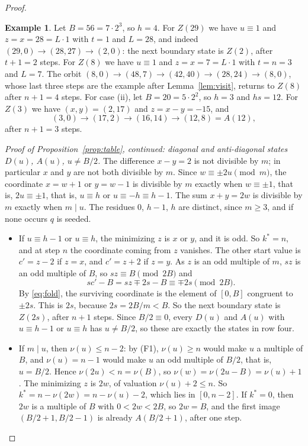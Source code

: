 \documentclass[11pt]{amsart}
\theoremstyle{definition}
\newtheorem*{example}{Example}
\theoremstyle{remark}
\newcommand{\vt}{\nu}
\begin{document}
\begin{proof}
\begin{example}
Let $B=56=7\cdot2^3$, so $h=4$. For $Z(29)$ we have $u\equiv1$ and $z=x=28=L\cdot1$ with $t=1$ and $L=28$, and indeed $(29,0)\to(28,27)\to(2,0)$: the next boundary state is $Z(2)$, after $t+1=2$ steps. For $Z(8)$ we have $u\equiv1$ and $z=x=7=L\cdot1$ with $t=n=3$ and $L=7$. The orbit $(8,0)\to(48,7)\to(42,40)\to(28,24)\to(8,0)$, whose last three steps are the example after Lemma~\ref{lem:visit}, returns to $Z(8)$ after $n+1=4$ steps. For case (ii), let $B=20=5\cdot2^2$, so $h=3$ and $hs=12$. For $Z(3)$ we have $(x,y)=(2,17)$ and $z=x-y=-15$, and
\[
(3,0)\to(17,2)\to(16,14)\to(12,8)=A(12),
\]
after $n+1=3$ steps.
\end{example}

\emph{Proof of Proposition~\ref{prop:table}, continued: diagonal and anti-diagonal states $D(u)$, $A(u)$, $u\ne B/2$.} The difference $x-y=2$ is not divisible by $m$; in particular $x$ and $y$ are not both divisible by $m$. Since $w\equiv\pm2u\pmod m$, the coordinate $x=w+1$ or $y=w-1$ is divisible by $m$ exactly when $w\equiv\pm1$, that is, $2u\equiv\pm1$, that is, $u\equiv h$ or $u\equiv-h\equiv h-1$. The sum $x+y=2w$ is divisible by $m$ exactly when $m\mid u$. The residues $0$, $h-1$, $h$ are distinct, since $m\ge3$, and if none occurs $q$ is seeded.
\begin{itemize}
\item[(i)] If $u\equiv h-1$ or $u\equiv h$, the minimizing $z$ is $x$ or $y$, and it is odd. So $k^*=n$, and at step $n$ the coordinate coming from $z$ vanishes. The other start value is $c'=z-2$ if $z=x$, and $c'=z+2$ if $z=y$. As $z$ is an odd multiple of $m$, $sz$ is an odd multiple of $B$, so $sz\equiv B\pmod{2B}$ and
\[
sc'-B=sz\mp2s-B\equiv\mp2s\pmod{2B}.
\]
By \eqref{eq:fold}, the surviving coordinate is the element of $[0,B]$ congruent to $\pm2s$. This is $2s$, because $2s=2B/m<B$. So the next boundary state is $Z(2s)$, after $n+1$ steps. Since $B/2\equiv0$, every $D(u)$ and $A(u)$ with $u\equiv h-1$ or $u\equiv h$ has $u\ne B/2$, so these are exactly the states in row four.
\item[(ii)] If $m\mid u$, then $\vt(u)\le n-2$: by (F1), $\vt(u)\ge n$ would make $u$ a multiple of $B$, and $\vt(u)=n-1$ would make $u$ an odd multiple of $B/2$, that is, $u=B/2$. Hence $\vt(2u)<n=\vt(B)$, so $\vt(w)=\vt(2u-B)=\vt(u)+1$. The minimizing $z$ is $2w$, of valuation $\vt(u)+2\le n$. So $k^*=n-\vt(2w)=n-\vt(u)-2$, which lies in $[0,n-2]$. If $k^*=0$, then $2w$ is a multiple of $B$ with $0<2w<2B$, so $2w=B$, and the first image $(B/2+1,B/2-1)$ is already $A(B/2+1)$, after one step.


\end{itemize}
\end{proof}
\end{document}
